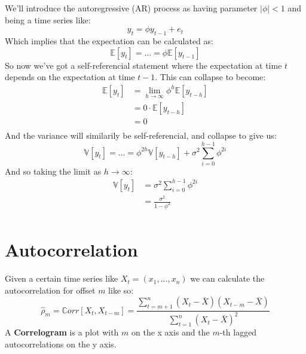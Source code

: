 We'll introduce the autoregressive (AR) process as having parameter $|\phi| <
1$ and being a time series like:
\begin{equation*}
    y_t = \phi y_{t-1} + e_t 
\end{equation*}
Which implies that the expectation can be calculated as:
\begin{equation*}
    \mathbb{E}[y_t] = \dots = \phi \mathbb{E}[y_{t-1}] 
\end{equation*}
So now we've got a self-referencial statement where the expectation at time
$t$ depends on the expectation at time $t-1$. This can collapse to become:
\begin{equation*}
    \begin{aligned}
        \mathbb{E}[y_t] &= \lim_{h\to\infty} \phi^h \mathbb{E}[y_{t-h}]  \\
            &= 0 \cdot \mathbb{E}[y_{t-h}]  \\
            &= 0 \\
    \end{aligned}
\end{equation*}
And the variance will similarily be self-referencial, and collapse to give us:
\begin{equation*}
    \mathbb{V}[y_t] = \dots = \phi^{2h} \mathbb{V}[y_{t-h}] + \sigma^2
    \sum_{i=0}^{h-1} \phi^{2i}
\end{equation*}
And so taking the limit as $h\to\infty$:
 \begin{equation*}
     \begin{aligned}
         \mathbb{V}[y_t] &= \sigma^2 \sum_{i=0}^{h-1} \phi^{2i}\\
                         &= \frac{\sigma^2}{1 - \phi^2} \\
     \end{aligned}
\end{equation*}

\section{Autocorrelation}
Given a certain time series like $X_t = (x_1, \dots, x_n)$ we can
calculate the autocorrelation for offset $m$ like so:
\begin{equation*}
    \hat{\rho}_m = \mathbb{C}orr[X_t, X_{t-m}] = \frac{
        \sum_{t=m+1}^{n} \left( X_t - \bar{X} \right) \left( X_{t-m} - \bar{X} \right)
        }{
        \sum_{t=1}^{n} \left( X_t - \bar{X}\right)^2
        }
\end{equation*}
A \textbf{Correlogram} is a plot with $m$ on the x axis and the $m$-th lagged
autocorrelations on the y axis.

